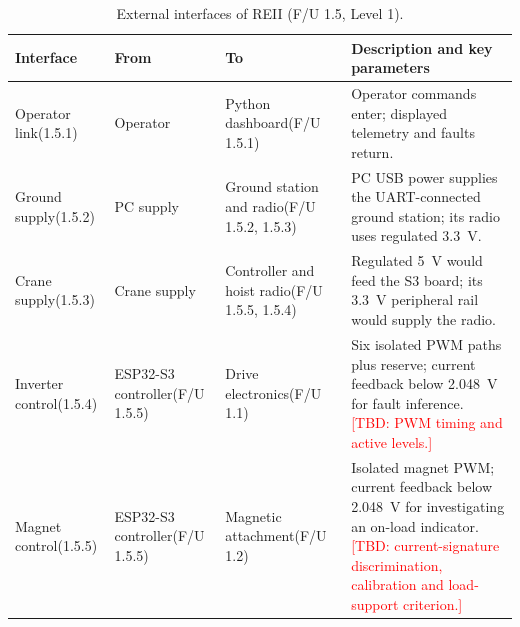\begingroup
\setlength{\tabcolsep}{4pt}
\renewcommand{\arraystretch}{1.15}



\begin{table}[H]
    \centering
    \footnotesize
    \caption{External interfaces of REII (F/U 1.5, Level 1).}
    \label{tab:reii-external}

    \begin{tabularx}{\textwidth}{@{}
        >{\raggedright\arraybackslash}p{2.15cm}
        >{\raggedright\arraybackslash}p{2.7cm}
        >{\raggedright\arraybackslash}p{2.9cm}
        >{\raggedright\arraybackslash}X
    @{}}
        \toprule
        \textbf{Interface} &
        \textbf{From} &
        \textbf{To} &
        \textbf{Description and key parameters} \\
        \midrule

        Operator link\newline (1.5.1) &
        Operator &
        Python dashboard\newline (F/U 1.5.1) &
        Operator commands enter; displayed telemetry and faults return.
        \\[3pt]

        Ground supply\newline (1.5.2) &
        PC supply &
        Ground station and radio\newline (F/U 1.5.2, 1.5.3) &
        PC USB power supplies the UART-connected ground station;
        its radio uses regulated 3.3~V.
        \\[3pt]

        Crane supply\newline (1.5.3) &
        Crane supply &
        Controller and hoist radio\newline (F/U 1.5.5, 1.5.4) &
        Regulated 5~V would feed the S3 board; its 3.3~V
        peripheral rail would supply the radio.
        \\[3pt]

        Inverter control\newline (1.5.4) &
        ESP32-S3 controller\newline (F/U 1.5.5) &
        Drive electronics\newline (F/U 1.1) &
        Six isolated PWM paths plus reserve; current feedback
        below 2.048~V for fault inference.
        \textcolor{red}{[TBD: PWM timing and active levels.]}
        \\[3pt]

        Magnet control\newline (1.5.5) &
        ESP32-S3 controller\newline (F/U 1.5.5) &
        Magnetic attachment\newline (F/U 1.2) &
        Isolated magnet PWM; current feedback below 2.048~V
        for investigating an on-load indicator.
        \textcolor{red}{[TBD: current-signature discrimination,
        calibration and load-support criterion.]}
        \\[3pt]


\end{tabularx}
\end{table}
